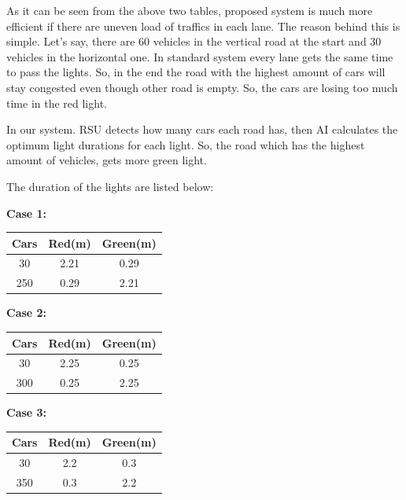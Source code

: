 \documentclass[conference]{IEEEtran}
\begin{document}
As it can be seen from the above two tables, proposed system is much more efficient if there are uneven load of traffics in each lane. The reason behind this is simple. Let's say, there are 60 vehicles in the vertical road at the start and 30 vehicles in the horizontal one. In standard system every lane gets the same time to pass the lights. So, in the end the road with the highest amount of cars will stay congested even though other road is empty. So, the cars are losing too much time in the red light.

In our system. RSU detects how many cars each road has, then AI calculates the optimum light durations for each light. So, the road which has the highest amount of vehicles, gets more green light.
\newline

\par The duration of the lights are listed below:
\newline

\begin{table}[h!]
	\centering\textbf{Case 1:}
	\centering
	\begin{tabular}{||c c c||} 
		\hline
		\textbf{Cars} & \textbf{Red(m)} & \textbf{Green(m)} \\ [0.5ex] 
		\hline\hline
		30   & 2.21   & 0.29     \\ 
		\hline
		250  & 0.29   & 2.21     \\
		\hline
	\end{tabular}
\end{table}


\begin{table}[h!]
	\centering\textbf{Case 2:}
	\centering
	\begin{tabular}{||c c c||} 
		\hline
		\textbf{Cars} & \textbf{Red(m)} & \textbf{Green(m)} \\ [0.5ex] 
		\hline\hline
		30   & 2.25   & 0.25     \\ 
		\hline
		300  & 0.25   & 2.25     \\
		\hline
		
	\end{tabular}
\end{table}


\begin{table}[h!]
	\centering\textbf{Case 3:}
	\centering
	\begin{tabular}{||c c c||} 
		\hline
		\textbf{Cars} & \textbf{Red(m)} & \textbf{Green(m)} \\ [0.5ex] 
		\hline\hline
		30   & 2.2    & 0.3      \\ 
		\hline
		350  & 0.3    & 2.2      \\
		\hline
		
	\end{tabular}
\end{table}
\end{document}
